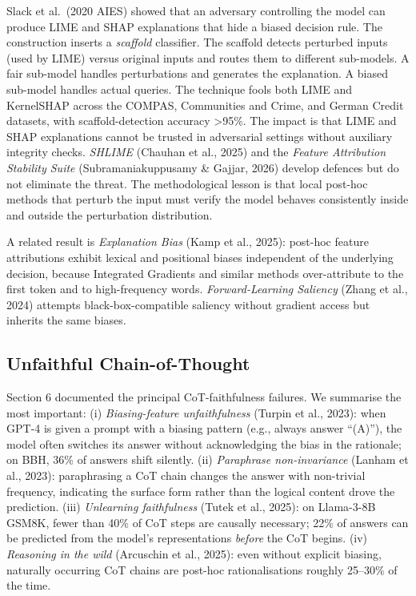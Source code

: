 Slack et al.~(2020 AIES) showed that an adversary controlling the model can produce LIME and SHAP explanations that hide a biased decision rule. The construction inserts a \emph{scaffold} classifier. The scaffold detects perturbed inputs (used by LIME) versus original inputs and routes them to different sub-models. A fair sub-model handles perturbations and generates the explanation. A biased sub-model handles actual queries. The technique fools both LIME and KernelSHAP across the COMPAS, Communities and Crime, and German Credit datasets, with scaffold-detection accuracy \textgreater95\%. The impact is that LIME and SHAP explanations cannot be trusted in adversarial settings without auxiliary integrity checks. \emph{SHLIME} (Chauhan et al., 2025) and the \emph{Feature Attribution Stability Suite} (Subramaniakuppusamy \& Gajjar, 2026) develop defences but do not eliminate the threat. The methodological lesson is that local post-hoc methods that perturb the input must verify the model behaves consistently inside and outside the perturbation distribution.

A related result is \emph{Explanation Bias} (Kamp et al., 2025): post-hoc feature attributions exhibit lexical and positional biases independent of the underlying decision, because Integrated Gradients and similar methods over-attribute to the first token and to high-frequency words. \emph{Forward-Learning Saliency} (Zhang et al., 2024) attempts black-box-compatible saliency without gradient access but inherits the same biases.

\subsection{Unfaithful Chain-of-Thought}\label{unfaithful-chain-of-thought}

Section 6 documented the principal CoT-faithfulness failures. We summarise the most important: (i) \emph{Biasing-feature unfaithfulness} (Turpin et al., 2023): when GPT-4 is given a prompt with a biasing pattern (e.g., always answer ``(A)''), the model often switches its answer without acknowledging the bias in the rationale; on BBH, 36\% of answers shift silently. (ii) \emph{Paraphrase non-invariance} (Lanham et al., 2023): paraphrasing a CoT chain changes the answer with non-trivial frequency, indicating the surface form rather than the logical content drove the prediction. (iii) \emph{Unlearning faithfulness} (Tutek et al., 2025): on Llama-3-8B GSM8K, fewer than 40\% of CoT steps are causally necessary; 22\% of answers can be predicted from the model's representations \emph{before} the CoT begins. (iv) \emph{Reasoning in the wild} (Arcuschin et al., 2025): even without explicit biasing, naturally occurring CoT chains are post-hoc rationalisations roughly 25--30\% of the time.

